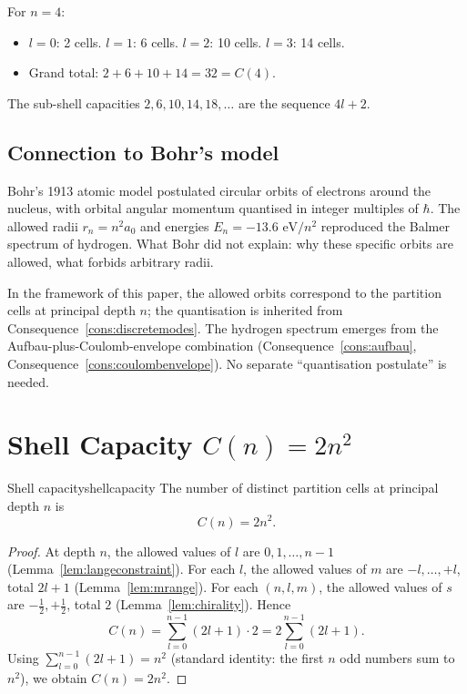 For $n=4$:
\begin{itemize}
\item $l=0$: 2 cells. $l=1$: 6 cells. $l=2$: 10 cells. $l=3$: 14 cells.
\item Grand total: $2+6+10+14=32=C(4)$.
\end{itemize}

The sub-shell capacities $2, 6, 10, 14, 18, \ldots$ are the sequence $4l+2$.

\subsection{Connection to Bohr's model}

Bohr's 1913 atomic model \citep{bohr1913} postulated circular orbits of electrons around the nucleus, with orbital angular momentum quantised in integer multiples of $\hbar$. The allowed radii $r_{n}=n^{2}a_{0}$ and energies $E_{n}=-13.6\text{ eV}/n^{2}$ reproduced the Balmer spectrum of hydrogen. What Bohr did not explain: why these specific orbits are allowed, what forbids arbitrary radii.

In the framework of this paper, the allowed orbits correspond to the partition cells at principal depth $n$; the quantisation is inherited from Consequence~\ref{cons:discretemodes}. The hydrogen spectrum emerges from the Aufbau-plus-Coulomb-envelope combination (Consequence~\ref{cons:aufbau}, Consequence~\ref{cons:coulombenvelope}). No separate ``quantisation postulate'' is needed.

\section{Shell Capacity $C(n)=2n^{2}$}
\label{sec:shellcapacity}

\begin{consequence}{Shell capacity}{shellcapacity}
The number of distinct partition cells at principal depth $n$ is
\begin{equation}
C(n)=2n^{2}.
\label{eq:shellcap}
\end{equation}
\end{consequence}

\begin{proof}
At depth $n$, the allowed values of $l$ are $0,1,\ldots,n-1$ (Lemma~\ref{lem:langeconstraint}). For each $l$, the allowed values of $m$ are $-l,\ldots,+l$, total $2l+1$ (Lemma~\ref{lem:mrange}). For each $(n,l,m)$, the allowed values of $s$ are $-\tfrac12,+\tfrac12$, total $2$ (Lemma~\ref{lem:chirality}). Hence
\begin{equation*}
C(n)=\sum_{l=0}^{n-1}(2l+1)\cdot 2=2\sum_{l=0}^{n-1}(2l+1).
\end{equation*}
Using $\sum_{l=0}^{n-1}(2l+1)=n^{2}$ (standard identity: the first $n$ odd numbers sum to $n^{2}$), we obtain $C(n)=2n^{2}$.
\end{proof}

